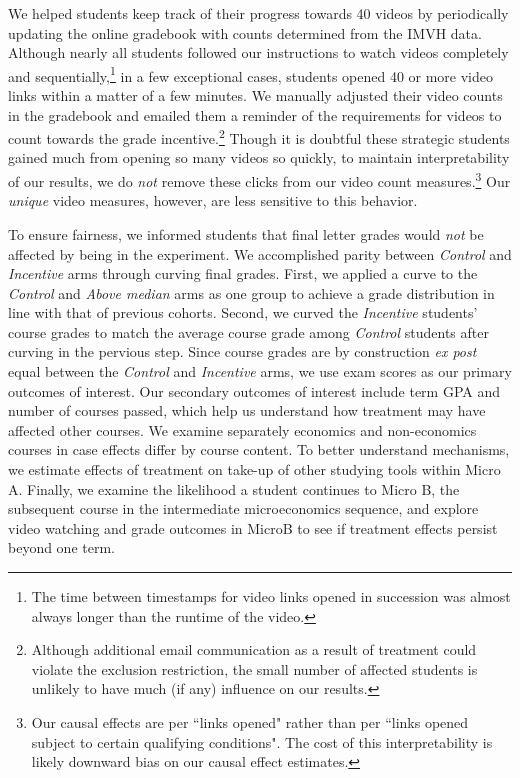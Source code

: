 \documentclass[12pt]{article}
\begin{document}
We helped students keep track of their progress towards 40 videos by periodically updating the online gradebook with counts determined from the IMVH data. Although nearly all students followed our instructions to watch videos completely and sequentially,\footnote{The time between timestamps for video links opened in succession was almost always longer than the runtime of the video.} in a few exceptional cases, students opened 40 or more video links within a matter of a few minutes. We manually adjusted their video counts in the gradebook and emailed them a reminder of the requirements for videos to count towards the grade incentive.\footnote{Although additional email communication as a result of treatment could violate the exclusion restriction, the small number of affected students is unlikely to have much (if any) influence on our results.} Though it is doubtful these strategic students gained much from opening so many videos so quickly, to maintain interpretability of our results, we do \textit{not} remove these clicks from our video count measures.\footnote{Our causal effects are per ``links opened" rather than per ``links opened subject to certain qualifying conditions". The cost of this interpretability is likely downward bias on our causal effect estimates.} Our \textit{unique} video measures, however, are less sensitive to this behavior.

To ensure fairness, we informed students that final letter grades would \textit{not} be affected by being in the experiment. We accomplished parity between \textit{Control} and \textit{Incentive} arms through curving final grades. First, we applied a curve to the \textit{Control} and \textit{Above median} arms as one group to achieve a grade distribution in line with that of previous cohorts. Second, we curved the \textit{Incentive} students' course grades to match the average course grade among \textit{Control} students after curving in the pervious step. Since course grades are by construction \textit{ex post} equal between the \textit{Control} and \textit{Incentive} arms, we use exam scores as our primary outcomes of interest. Our secondary outcomes of interest include term GPA and number of courses passed, which help us understand how treatment may have affected other courses. We examine separately economics and non-economics courses in case effects differ by course content. To better understand mechanisms, we estimate effects of treatment on take-up of other studying tools within Micro A. Finally, we examine the likelihood a student continues to Micro B, the subsequent course in the intermediate microeconomics sequence, and explore video watching and grade outcomes in MicroB to see if treatment effects persist beyond one term.
\end{document}
